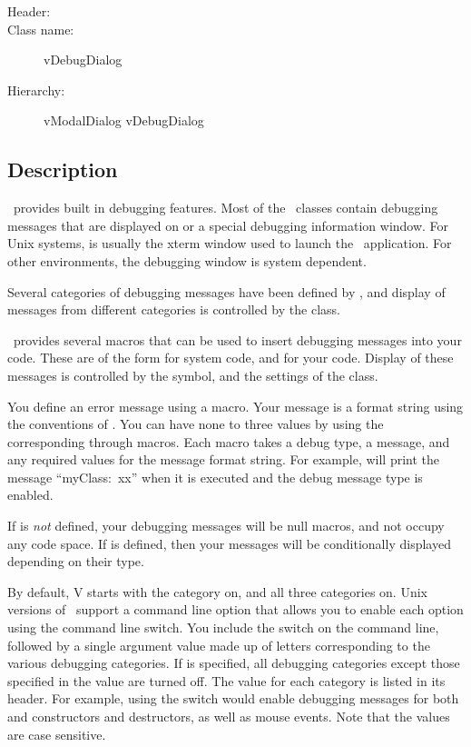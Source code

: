 \begin{description}
	\item [Header:] 
	\item [Class name:] vDebugDialog
 	\item [Hierarchy:] vModalDialog \rta vDebugDialog
\end{description}

\subsection* {Description}

\V\ provides built in debugging features. Most of the \V\ classes
contain debugging messages that are displayed on  or a
special debugging information window. For Unix systems, 
is usually the xterm window used to launch the \V\ application.
For other environments, the debugging window is system dependent.

Several categories of debugging messages have been defined by \V,
and display of messages from different categories is controlled
by the  class.

\V\ provides several macros that can be used to insert debugging
messages into your code. These are of the form  for
system code, and  for your code. Display of
these messages is controlled by the  symbol, and the
settings of the  class.

You define an error message using a  macro.
Your message is a format string using the conventions of .
You can have none to three values by using the corresponding
 through  macros. Each macro
takes a debug type, a message, and any required values for the
message format string. For example,
will print the message ``myClass:~xx'' when it is executed and the
 debug message type is enabled.

If  is \emph{not} defined, your debugging messages will
be null macros, and not occupy any code space.  If  is
defined, then your messages will be conditionally displayed depending
on their type.

By default, V starts with the  category 
on, and all three  categories on. Unix versions of \V\
support a command line option that allows you to enable each
option using
the  command line switch. You include the switch
\code{-vDebug} on the command line, followed by a single argument
value made up of letters corresponding to the various debugging
categories. If  is specified, all debugging categories
except those specified in the value are turned off. The value
for each category is listed in its header. For example, using
the switch  would enable debugging messages
for both  and  constructors and destructors,
as well as \code{System} mouse events.
Note that the values are case sensitive.



